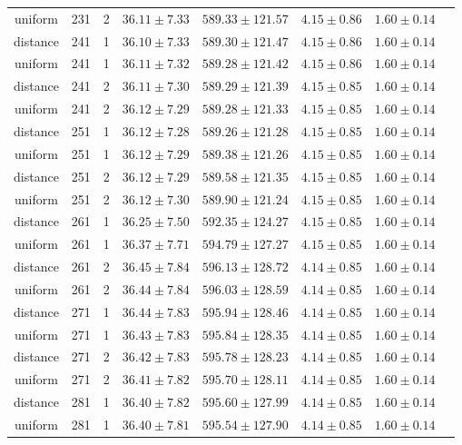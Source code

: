 \begin{tabular}{cccrrrrr}
uniform & 231 & 2 & $36.11 \pm 7.33$ & $589.33 \pm 121.57$ & $4.15 \pm 0.86$ & $1.60 \pm 0.14$\\
distance & 241 & 1 & $36.10 \pm 7.33$ & $589.30 \pm 121.47$ & $4.15 \pm 0.86$ & $1.60 \pm 0.14$\\
uniform & 241 & 1 & $36.11 \pm 7.32$ & $589.28 \pm 121.42$ & $4.15 \pm 0.86$ & $1.60 \pm 0.14$\\
distance & 241 & 2 & $36.11 \pm 7.30$ & $589.29 \pm 121.39$ & $4.15 \pm 0.85$ & $1.60 \pm 0.14$\\
uniform & 241 & 2 & $36.12 \pm 7.29$ & $589.28 \pm 121.33$ & $4.15 \pm 0.85$ & $1.60 \pm 0.14$\\
distance & 251 & 1 & $36.12 \pm 7.28$ & $589.26 \pm 121.28$ & $4.15 \pm 0.85$ & $1.60 \pm 0.14$\\
uniform & 251 & 1 & $36.12 \pm 7.29$ & $589.38 \pm 121.26$ & $4.15 \pm 0.85$ & $1.60 \pm 0.14$\\
distance & 251 & 2 & $36.12 \pm 7.29$ & $589.58 \pm 121.35$ & $4.15 \pm 0.85$ & $1.60 \pm 0.14$\\
uniform & 251 & 2 & $36.12 \pm 7.30$ & $589.90 \pm 121.24$ & $4.15 \pm 0.85$ & $1.60 \pm 0.14$\\
distance & 261 & 1 & $36.25 \pm 7.50$ & $592.35 \pm 124.27$ & $4.15 \pm 0.85$ & $1.60 \pm 0.14$\\
uniform & 261 & 1 & $36.37 \pm 7.71$ & $594.79 \pm 127.27$ & $4.15 \pm 0.85$ & $1.60 \pm 0.14$\\
distance & 261 & 2 & $36.45 \pm 7.84$ & $596.13 \pm 128.72$ & $4.14 \pm 0.85$ & $1.60 \pm 0.14$\\
uniform & 261 & 2 & $36.44 \pm 7.84$ & $596.03 \pm 128.59$ & $4.14 \pm 0.85$ & $1.60 \pm 0.14$\\
distance & 271 & 1 & $36.44 \pm 7.83$ & $595.94 \pm 128.46$ & $4.14 \pm 0.85$ & $1.60 \pm 0.14$\\
uniform & 271 & 1 & $36.43 \pm 7.83$ & $595.84 \pm 128.35$ & $4.14 \pm 0.85$ & $1.60 \pm 0.14$\\
distance & 271 & 2 & $36.42 \pm 7.83$ & $595.78 \pm 128.23$ & $4.14 \pm 0.85$ & $1.60 \pm 0.14$\\
uniform & 271 & 2 & $36.41 \pm 7.82$ & $595.70 \pm 128.11$ & $4.14 \pm 0.85$ & $1.60 \pm 0.14$\\
distance & 281 & 1 & $36.40 \pm 7.82$ & $595.60 \pm 127.99$ & $4.14 \pm 0.85$ & $1.60 \pm 0.14$\\
uniform & 281 & 1 & $36.40 \pm 7.81$ & $595.54 \pm 127.90$ & $4.14 \pm 0.85$ & $1.60 \pm 0.14$\\

\end{tabular}

